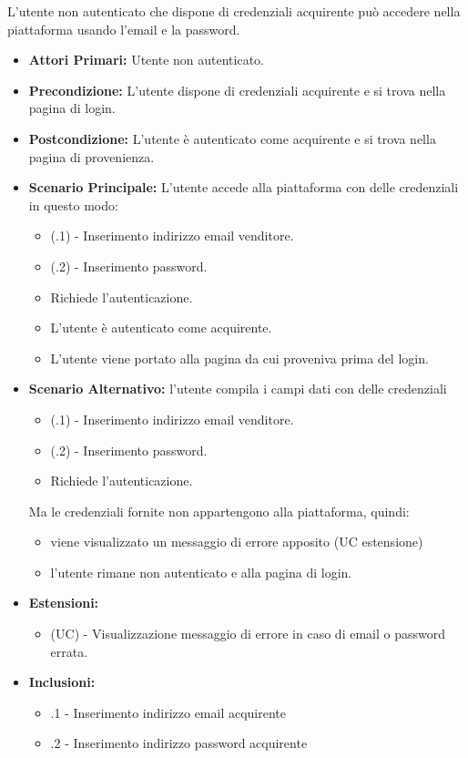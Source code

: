 L'utente non autenticato che dispone di credenziali acquirente può accedere nella piattaforma usando l'email e la password.
\begin{itemize}
	\item \textbf{Attori Primari:} Utente non autenticato.
	\item \textbf{Precondizione:} L'utente dispone di credenziali acquirente e si trova nella pagina di login.
	\item \textbf{Postcondizione:} L'utente è autenticato come acquirente e si trova nella pagina di provenienza.
	\item \textbf{Scenario Principale:} L'utente accede alla piattaforma con delle credenziali in questo modo:
	\begin{itemize}
		\item (\actualUC.1) - Inserimento indirizzo email venditore.
		\item (\actualUC.2) - Inserimento password.
		\item Richiede l'autenticazione.
		\item L'utente è autenticato come acquirente.
		\item L'utente viene portato alla pagina da cui proveniva prima del login.
	\end{itemize}
	\item \textbf{Scenario Alternativo:} l'utente compila i campi dati con delle credenziali 
	\begin{itemize}
		\item (\actualUC.1) - Inserimento indirizzo email venditore.
		\item (\actualUC.2) - Inserimento password.
		\item Richiede l'autenticazione.
	\end{itemize}
	Ma le credenziali fornite non appartengono alla piattaforma, quindi:
	\begin{itemize}
		\item viene visualizzato un messaggio di errore apposito (UC estensione)
		\item l'utente rimane non autenticato e alla pagina di login.
	\end{itemize}
	\item \textbf{Estensioni:}
	\begin{itemize}
		\item (UC) - Visualizzazione messaggio di errore in caso di email o password errata.
	\end{itemize}
	\item \textbf{Inclusioni:}
	\begin{itemize}
		\item \actualUC.1 - Inserimento indirizzo email acquirente
		\item \actualUC.2 - Inserimento indirizzo password acquirente
	\end{itemize}
\end{itemize}


